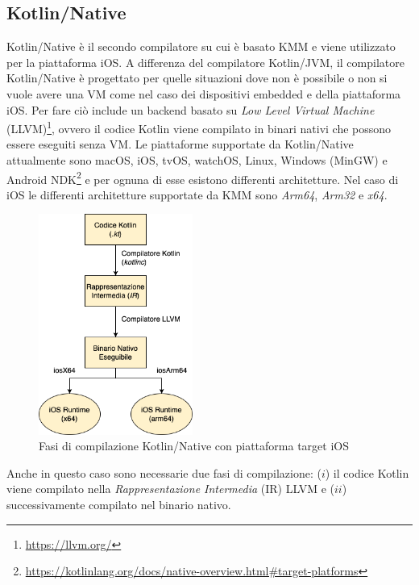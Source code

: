 \subsection{Kotlin/Native}
Kotlin/Native è il secondo compilatore su cui è basato KMM e viene utilizzato per la piattaforma iOS. A differenza del compilatore Kotlin/JVM, il compilatore Kotlin/Native è progettato per quelle situazioni dove non è possibile o non si vuole avere una VM come nel caso dei dispositivi embedded e della piattaforma iOS. Per fare ciò include un backend basato su \textit{Low Level Virtual Machine} (LLVM)\footnote{\url{https://llvm.org/}}, ovvero il codice Kotlin viene compilato in binari nativi che possono essere eseguiti senza VM\cite{nagy2022simplifying}. Le piattaforme supportate da Kotlin/Native attualmente sono macOS, iOS, tvOS, watchOS, Linux, Windows (MinGW) e Android NDK\footnote{\url{https://kotlinlang.org/docs/native-overview.html\#target-platforms}} e per ognuna di esse esistono differenti architetture. Nel caso di iOS le differenti architetture supportate da KMM sono \textit{Arm64}, \textit{Arm32} e \textit{x64}.
\begin{figure}[H]
\centering
\includegraphics[width=0.45\textwidth]{img/tesi-10-kotlinnative.drawio.png}
\caption{Fasi di compilazione Kotlin/Native con piattaforma target iOS}
\end{figure}
Anche in questo caso sono necessarie due fasi di compilazione: ($i$) il codice Kotlin viene compilato nella \textit{Rappresentazione Intermedia} (IR) LLVM e ($ii$) successivamente compilato nel binario nativo.

